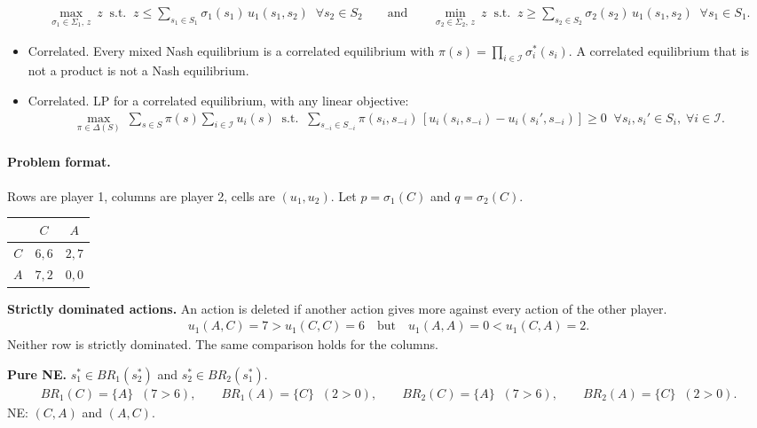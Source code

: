 \documentclass{article}
\begin{document}
\begin{itemize}
    \begin{align*}
        \max_{\sigma_1\in\Sigma_1,\,z}\ z
        \;\;\text{s.t.}\;\; z\le\sum_{s_1\in S_1}\sigma_1(s_1)\,u_1(s_1,s_2)\;\;\forall s_2\in S_2
        \qquad\text{and}\qquad
        \min_{\sigma_2\in\Sigma_2,\,z}\ z
        \;\;\text{s.t.}\;\; z\ge\sum_{s_2\in S_2}\sigma_2(s_2)\,u_1(s_1,s_2)\;\;\forall s_1\in S_1.
    \end{align*}
    \item Correlated. Every mixed Nash equilibrium is a correlated equilibrium with $\pi(s)=\prod_{i\in\mathcal I}\sigma_i^*(s_i)$. A correlated equilibrium that is not a product is not a Nash equilibrium.
    \item Correlated. LP for a correlated equilibrium, with any linear objective:
    \begin{align*}
        \max_{\pi\in\Delta(S)}\ \sum_{s\in S}\pi(s)\sum_{i\in\mathcal I}u_i(s)
        \;\;\text{s.t.}\;\;
        \sum_{s_{-i}\in S_{-i}}\pi(s_i,s_{-i})\,[u_i(s_i,s_{-i})-u_i(s_i',s_{-i})]\ge 0\;\;\forall s_i,s_i'\in S_i,\;\forall i\in\mathcal I.
    \end{align*}
\end{itemize}

\paragraph{Problem format.}
Rows are player 1, columns are player 2, cells are $(u_1,u_2)$. Let $p=\sigma_1(C)$ and $q=\sigma_2(C)$.
\begin{center}
\begin{tabular}{c|cc}
 & $C$ & $A$ \\
\hline
$C$ & $6,6$ & $2,7$ \\
$A$ & $7,2$ & $0,0$ \\
\end{tabular}
\end{center}

\textbf{Strictly dominated actions.} An action is deleted if another action gives more against every action of the other player.
\begin{align*}
    u_1(A,C)=7>u_1(C,C)=6 \quad\text{but}\quad u_1(A,A)=0<u_1(C,A)=2.
\end{align*}
Neither row is strictly dominated. The same comparison holds for the columns.

\textbf{Pure NE.} $s_1^*\in BR_1(s_2^*)$ and $s_2^*\in BR_2(s_1^*)$.
\begin{align*}
    BR_1(C)=\{A\}\;\;(7>6),\qquad BR_1(A)=\{C\}\;\;(2>0),\qquad BR_2(C)=\{A\}\;\;(7>6),\qquad BR_2(A)=\{C\}\;\;(2>0).
\end{align*}
NE: $(C,A)$ and $(A,C)$.
\end{document}
